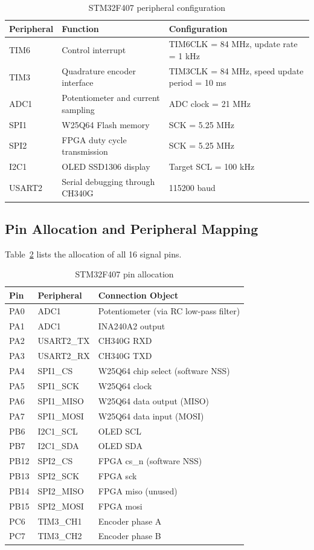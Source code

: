 \documentclass[12pt, a4paper]{report}
\begin{document}
\begin{table}[H]
\centering
\caption{STM32F407 peripheral configuration}
\label{tab:mcu_peripherals}
\small
\begin{tabular}{@{}p{}p{}p{}@{}}
\toprule
Peripheral & Function & Configuration \\
\midrule
TIM6 & Control interrupt & TIM6CLK = 84 MHz, update rate = 1 kHz \\
TIM3 & Quadrature encoder interface & TIM3CLK = 84 MHz, speed update period = 10 ms \\
ADC1 & Potentiometer and current sampling & ADC clock = 21 MHz \\
SPI1 & W25Q64 Flash memory & SCK = 5.25 MHz \\
SPI2 & FPGA duty cycle transmission & SCK = 5.25 MHz \\
I2C1 & OLED SSD1306 display & Target SCL = 100 kHz \\
USART2 & Serial debugging through CH340G & 115200 baud \\
\bottomrule
\end{tabular}
\end{table}

\subsection{Pin Allocation and Peripheral Mapping}

Table~\ref{tab:pin_allocation} lists the allocation of all 16 signal pins.
\begin{table}[H]
\centering
\caption{STM32F407 pin allocation}
\label{tab:pin_allocation}
\small
\begin{tabular}{@{}p{}p{}p{}@{}}
\toprule
Pin & Peripheral & Connection Object \\
\midrule
PA0 & ADC1 & Potentiometer (via RC low-pass filter) \\
PA1 & ADC1 & INA240A2 output \\
PA2 & USART2\_TX & CH340G RXD \\
PA3 & USART2\_RX & CH340G TXD \\
PA4 & SPI1\_CS & W25Q64 chip select (software NSS) \\
PA5 & SPI1\_SCK & W25Q64 clock \\
PA6 & SPI1\_MISO & W25Q64 data output (MISO) \\
PA7 & SPI1\_MOSI & W25Q64 data input (MOSI) \\
PB6 & I2C1\_SCL & OLED SCL \\
PB7 & I2C1\_SDA & OLED SDA \\
PB12 & SPI2\_CS & FPGA cs\_n (software NSS) \\
PB13 & SPI2\_SCK & FPGA sck \\
PB14 & SPI2\_MISO & FPGA miso (unused) \\
PB15 & SPI2\_MOSI & FPGA mosi \\
PC6 & TIM3\_CH1 & Encoder phase A \\
PC7 & TIM3\_CH2 & Encoder phase B \\
\bottomrule
\end{tabular}
\end{table}
\end{document}
